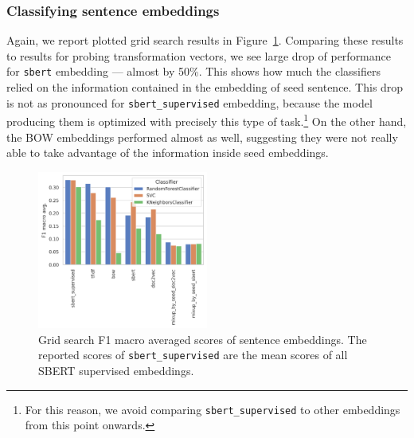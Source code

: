 \documentclass[11pt]{article}
\newcommand{\Embed}[1]{\texttt{#1}}
\begin{document}
\subsubsection{Classifying sentence embeddings}

Again, we report plotted grid search results in
Figure~\ref{fig:cls_gs_no_context_embed_comparison}. Comparing these results to
results for probing transformation vectors, we see large drop of performance for
\Embed{sbert} embedding --- almost by 50\%. This shows how much the classifiers
relied on the information contained in the embedding of seed sentence. This
drop is not as pronounced for \Embed{sbert\_supervised} embedding, because the
model producing them is optimized with precisely this type of
task.\footnote{For this reason, we avoid comparing \Embed{sbert\_supervised} to
other embeddings from this point onwards.} On the other hand, the BOW
embeddings performed almost as well, suggesting they were not really able to
take advantage of the information inside seed embeddings.

\begin{figure}[htp]
  \centering
  \includegraphics[width=0.5\textwidth]{./figs/cls_gs_no_context_embed_comparison.png}

  \caption{Grid search F1 macro averaged scores of sentence embeddings. The
  reported scores of \Embed{sbert\_supervised} are the mean scores
  of all SBERT supervised
  embeddings.}\label{fig:cls_gs_no_context_embed_comparison}

\end{figure}
\end{document}
